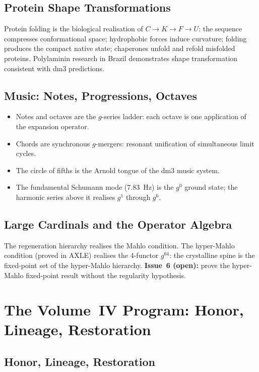 \documentclass[11pt, twoside, openright]{book}
\theoremstyle{plain}
\theoremstyle{definition}
\begin{document}
\section{Protein Shape Transformations}

Protein folding is the biological realisation of $C \to K \to F \to U$:
the sequence compresses conformational space; hydrophobic forces induce
curvature; folding produces the compact native state; chaperones
unfold and refold misfolded proteins. Polylaminin research in Brazil
demonstrates shape transformation consistent with dm3 predictions.

\section{Music: Notes, Progressions, Octaves}

\begin{itemize}[leftmargin=*]
  \item Notes and octaves are the $g$-series ladder: each octave is one
    application of the expansion operator.
  \item Chords are synchronous $g$-mergers: resonant unification of
    simultaneous limit cycles.
  \item The circle of fifths is the Arnold tongue of the dm3 music
    system.
  \item The fundamental Schumann mode (7.83~Hz) is the $g^0$ ground
    state; the harmonic series above it realises $g^1$ through $g^6$.
\end{itemize}

\section{Large Cardinals and the Operator Algebra}

The regeneration hierarchy realises the Mahlo condition.
The hyper-Mahlo condition (proved in AXLE) realises the 4-functor
$g^{64}$: the crystalline spine is the fixed-point set of the
hyper-Mahlo hierarchy. \textbf{Issue~6 (open):} prove the hyper-Mahlo
fixed-point result without the regularity hypothesis.

\chapter{The Volume~IV Program: Honor, Lineage, Restoration}

\section{Honor, Lineage, Restoration}
\end{document}
